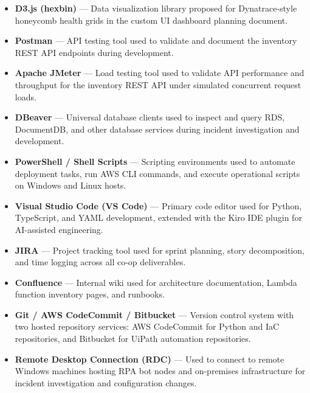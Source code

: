 \begin{itemize}
    \item \textbf{D3.js (hexbin)} --- Data visualization library proposed
          for Dynatrace-style honeycomb health grids in the custom UI
          dashboard planning document.

    \item \textbf{Postman} --- API testing tool used to validate and
          document the inventory REST API endpoints during development.

    \item \textbf{Apache JMeter} --- Load testing tool used to validate
          API performance and throughput for the inventory REST API
          under simulated concurrent request loads.

    \item \textbf{DBeaver} --- Universal database clients used to inspect
          and query RDS, DocumentDB, and other database services during
          incident investigation and development.

    \item \textbf{PowerShell / Shell Scripts} --- Scripting environments
          used to automate deployment tasks, run AWS CLI commands, and
          execute operational scripts on Windows and Linux hosts.

    \item \textbf{Visual Studio Code (VS Code)} --- Primary code editor
          used for Python, TypeScript, and YAML development, extended
          with the Kiro IDE plugin for AI-assisted engineering.

    \item \textbf{JIRA} --- Project tracking tool used for sprint
          planning, story decomposition, and time logging across all
          co-op deliverables.

    \item \textbf{Confluence} --- Internal wiki used for architecture
          documentation, Lambda function inventory pages, and runbooks.

    \item \textbf{Git / AWS CodeCommit / Bitbucket} --- Version control
          system with two hosted repository services: AWS CodeCommit
          for Python and IaC repositories, and Bitbucket for UiPath
          automation repositories.

    \item \textbf{Remote Desktop Connection (RDC)} --- Used to connect
          to remote Windows machines hosting RPA bot nodes and
          on-premises infrastructure for incident investigation and
          configuration changes.

\end{itemize}


